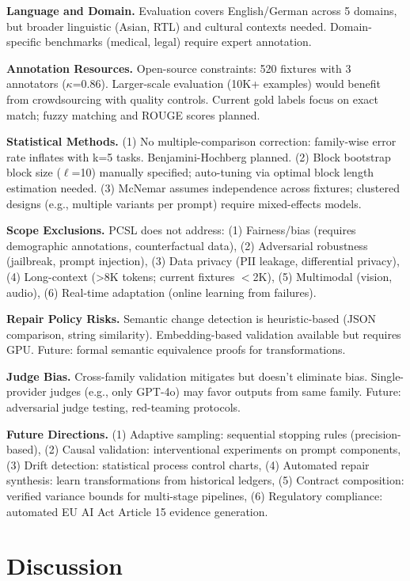 \documentclass[sigconf]{acmart}
\begin{document}
\textbf{Language and Domain.} Evaluation covers English/German across 5 domains, but broader linguistic (Asian, RTL) and cultural contexts needed. Domain-specific benchmarks (medical, legal) require expert annotation.

\textbf{Annotation Resources.} Open-source constraints: 520 fixtures with 3 annotators (\(\kappa\)=0.86). Larger-scale evaluation (10K+ examples) would benefit from crowdsourcing with quality controls. Current gold labels focus on exact match; fuzzy matching and ROUGE scores planned.

\textbf{Statistical Methods.} (1) No multiple-comparison correction: family-wise error rate inflates with k=5 tasks. Benjamini-Hochberg planned. (2) Block bootstrap block size (\(\ell\)=10) manually specified; auto-tuning via optimal block length estimation needed. (3) McNemar assumes independence across fixtures; clustered designs (e.g., multiple variants per prompt) require mixed-effects models.

\textbf{Scope Exclusions.} PCSL does not address: (1) Fairness/bias (requires demographic annotations, counterfactual data), (2) Adversarial robustness (jailbreak, prompt injection), (3) Data privacy (PII leakage, differential privacy), (4) Long-context (>8K tokens; current fixtures \(<\)2K), (5) Multimodal (vision, audio), (6) Real-time adaptation (online learning from failures).

\textbf{Repair Policy Risks.} Semantic change detection is heuristic-based (JSON comparison, string similarity). Embedding-based validation available but requires GPU. Future: formal semantic equivalence proofs for transformations.

\textbf{Judge Bias.} Cross-family validation mitigates but doesn't eliminate bias. Single-provider judges (e.g., only GPT-4o) may favor outputs from same family. Future: adversarial judge testing, red-teaming protocols.

\textbf{Future Directions.} (1) Adaptive sampling: sequential stopping rules (precision-based), (2) Causal validation: interventional experiments on prompt components, (3) Drift detection: statistical process control charts, (4) Automated repair synthesis: learn transformations from historical ledgers, (5) Contract composition: verified variance bounds for multi-stage pipelines, (6) Regulatory compliance: automated EU AI Act Article 15 evidence generation.

\section{Discussion}
\end{document}
